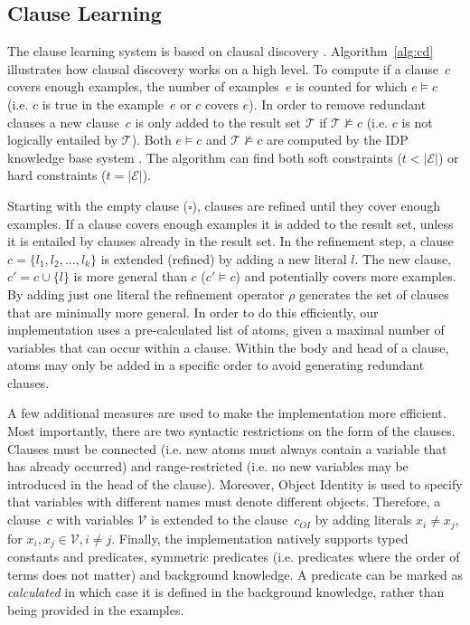 \documentclass[letterpaper]{article}
\newcommand{\sym}[1]{\ensuremath{\mathcal{#1}}}
\theoremstyle{definition}
\newcommand{\abs}[1]{\left|#1\right|}
\begin{document}
\subsection{Clause Learning}
The clause learning system is based on clausal discovery \cite{DeRaedt:ClausalDiscovery}.
Algorithm~\ref{alg:cd} illustrates how clausal discovery works on a high level.
To compute if a clause~$c$ covers enough examples, the number of examples~$e$ is counted for which $e \models c$ (i.e. $c$ is true in the example~$e$ or $c$ covers $e$).
In order to remove redundant clauses a new clause~$c$ is only added to the result set $\sym{T}$ if $\sym{T} \not\models c$ (i.e. $c$ is not logically entailed by \sym{T}).
Both $e \models c$ and $\sym{T} \not\models c$ are computed by the IDP knowledge base system \cite{de2013prototype,wittocx2008idp}.
The algorithm can find both soft constraints ($t < \abs{\sym{E}}$) or hard constraints ($t = \abs{\sym{E}}$).

Starting with the empty clause ($\square$), clauses are refined until they cover enough examples.
If a clause covers enough examples it is added to the result set, unless it is entailed by clauses already in the result set.
In the refinement step, a clause $c = \{l_1, l_2, ..., l_k\}$ is extended (refined) by adding a new literal $l$.
The new clause, $c' = c \cup \{l\}$ is more general than $c$ ($c' \models c$) and potentially covers more examples.
By adding just one literal the refinement operator $\rho$ generates the set of clauses that are minimally more general.
In order to do this efficiently, our implementation uses a pre-calculated list of atoms, given a maximal number of variables that can occur within a clause.
Within the body and head of a clause, atoms may only be added in a specific order to avoid generating redundant clauses.

A few additional measures are used to make the implementation more efficient.
Most importantly, there are two syntactic restrictions on the form of the clauses.
Clauses must be connected (i.e. new atoms must always contain a variable that has already occurred) and range-restricted (i.e. no new variables may be introduced in the head of the clause).
Moreover, Object Identity is used to specify that variables with different names must denote different objects.
Therefore, a clause~$c$ with variables \sym{V} is extended to the clause~$c_{OI}$ by adding literals $x_i \neq x_j$, for $x_i, x_j \in \sym{V}, i \neq j$.
Finally, the implementation natively supports typed constants and predicates, symmetric predicates (i.e. predicates where the order of terms does not matter) and background knowledge.
A predicate can be marked as \emph{calculated} in which case it is defined in the background knowledge, rather than being provided in the examples. 
\end{document}
